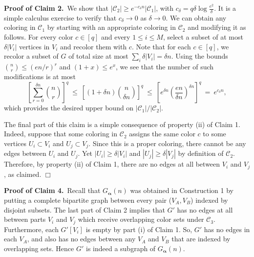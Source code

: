 \documentclass[11pt]{article}
\newcommand{\blpha}{{\boldsymbol\alpha}}
\begin{document}
\vspace{3mm}


\noindent \textbf{Proof of Claim 2.}\, We show that $|\mathcal{C}_2|
\geq e^{-c_\delta n} |\mathcal{C}_1|$, with $c_\delta = q \delta \log
\frac{e^2}{\delta}$.  It is a simple calculus exercise to verify that
$c_\delta \rightarrow 0$ as $\delta \rightarrow 0$.  We can obtain any
coloring in $\mathcal{C}_1$ by starting with an appropriate coloring
in $\mathcal{C}_2$ and modifying it as follows.  For every color $c
\in [q]$ and every $1 \leq i \leq M$, select a subset of at most
$\delta |V_i|$ vertices in $V_i$ and recolor them with $c$.  Note that
for each $c \in [q]$, we recolor a subset of $G$ of total size at most
$\sum_i \delta |V_i| = \delta n$.  Using the bounds ${n \choose r}
\leq (en/r)^r$ and $(1+x) \leq e^x$, we see that the number of such
modifications is at most
\begin{displaymath}
  \left[ \sum_{r = 0}^{\delta n} {n \choose r} \right]^q
  \ \leq \ \left[ (1 + \delta n) {n \choose \delta n} \right]^q
  \ \leq \ \left[ e^{\delta n} \left(\frac{en}{\delta n}\right)^{\delta n} \right]^q
  \ = \ e^{c_\delta n},
\end{displaymath}
which provides the desired upper bound on $|\mathcal{C}_1| /
|\mathcal{C}_2|$.

The final part of this claim is a simple consequence of property (ii)
of Claim 1.  Indeed, suppose that some coloring in $\mathcal{C}_2$
assigns the same color $c$ to some vertices $U_i \subset V_i$ and $U_j
\subset V_j$.  Since this is a proper coloring, there cannot be any
edges between $U_i$ and $U_j$.  Yet $|U_i| \geq \delta |V_i|$ and
$|U_j| \geq \delta |V_j|$ by definition of $\mathcal{C}_2$. Therefore, by
property (ii) of Claim 1, there are no edges at all between
$V_i$ and $V_j$, as claimed.  \hfill $\Box$



\vspace{3mm}


\noindent \textbf{Proof of Claim 4.}\, Recall that $G_\blpha(n)$ was
obtained in Construction 1 by putting a complete bipartite graph
between every pair ($V_A, V_B$) indexed by disjoint subsets.  The last
part of Claim 2 implies that $G'$ has no edges at all between parts
$V_i$ and $V_j$ which receive overlapping color sets under
$\mathcal{C}_3$.  Furthermore, each $G'[V_i]$ is empty by part (i) of
Claim 1.  So, $G'$ has no edges in each $V_A$, and also has no edges
between any $V_A$ and $V_B$ that are indexed by overlapping sets.
Hence $G'$ is indeed a subgraph of $G_\blpha(n)$.
\end{document}
